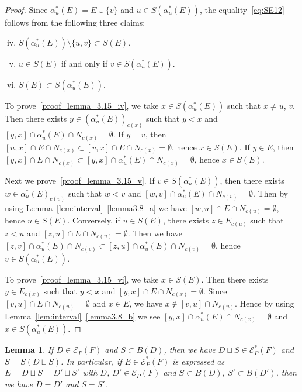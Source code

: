 \documentclass[10pt]{amsart}
\newtheorem{lemm}[theo]{Lemma}
\theoremstyle{definition}
\theoremstyle{remark}
\newcommand\EE{\mathcal{E}}
\begin{document}
\begin{proof}
Since $\alpha^*_u(E) = E \cup \{ v \}$ and 
$u\in S(\alpha^*_u(E))$, the equality~\eqref{eq:SE12} 
follows from the following three claims:
\begin{enumerate}[(i)]\setcounter{enumi}{3}
\item\label{proof_lemma_3.15_iv} %
$S(\alpha^*_u(E)) \setminus \{ u, v \} \subset S(E)$.
\item\label{proof_lemma_3.15_v} %
$u \in S(E)$ if and only if $v \in S(\alpha^*_u(E))$.
\item\label{proof_lemma_3.15_vi} %
$S(E) \subset S(\alpha^*_u(E))$.
\end{enumerate}

To prove~\ref{proof_lemma_3.15_iv}, we take $x \in S(\alpha^*_u(E))$ such that $x \neq u$, $v$.
Then there exists $y \in (\alpha^*_u(E))_{c(x)}$ such that $y<x$ 
and $[y,x] \cap \alpha^*_u(E) \cap N_{c(x)} = \emptyset$.
If $y = v$, then $[u,x] \cap E \cap N_{c(x)} \subset [v,x] \cap E \cap N_{c(x)} = \emptyset$, 
hence $x \in S(E)$.
If $y \in E$, then $[y,x] \cap E \cap N_{c(x)} \subset [y,x] \cap \alpha^*_u(E) \cap N_{c(x)} = \emptyset$, 
hence $x \in S(E)$.

Next we prove~\ref{proof_lemma_3.15_v}.
If $v \in S(\alpha^{*}_u(E))$, then there exists $w \in \alpha^*_u(E)_{c(v)}$ such that
$w<v$ and $[w,v] \cap \alpha^*_u(E) \cap N_{c(v)} = \emptyset$.
Then by using Lemma~\ref{lem:interval}~\ref{lemma3.8_a} we have $[w,u] \cap E \cap N_{c(u)} = \emptyset$, 
hence $u \in S(E)$.
Conversely, if $u \in S(E)$, there exists $z \in E_{c(u)}$ such that $z<u$ and 
$[z,u] \cap E \cap N_{c(u)} = \emptyset$.
Then we have $[z,v] \cap \alpha^*_u(E) \cap N_{c(v)} \subset [z,u] \cap \alpha^*_u(E) \cap N_{c(v)} = \emptyset$, 
hence $v \in S(\alpha^*_u(E))$.

To prove~\ref{proof_lemma_3.15_vi}, we take $x \in S(E)$.
Then there exists $y \in E_{c(x)}$ such that $y < x$ and $[y,x] \cap E \cap N_{c(x)} = \emptyset$.
Since $[v,u] \cap E \cap N_{c(u)} = \emptyset$ and $x \in E$, we have $x \not\in [v,u] \cap N_{c(u)}$.
Hence by using Lemma~\ref{lem:interval}~\ref{lemma3.8_b} we see $[y,x] \cap \alpha^*_u(E) \cap N_{c(x)} = \emptyset$ 
and $x \in S(\alpha^*_u(E))$.
\end{proof}

\begin{lemm}
\label{lem:SE2}
If $D \in \EE_P(F)$ and $S \subset B(D)$, 
then we have $D \sqcup S \in \EE^*_P(F)$ and $S = S(D \sqcup S)$.
In particular, if $E \in \EE^*_P(F)$ is expressed as $E = D \sqcup S = D' \sqcup S'$ 
with $D$, $D' \in \EE_P(F)$ and $S \subset B(D)$, $S' \subset B(D')$, then we have 
$D = D'$ and $S = S'$.
\end{lemm}
\end{document}

